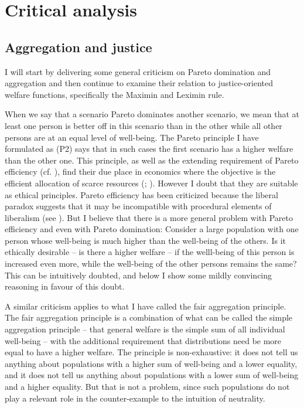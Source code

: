 \chapter{Critical analysis}
\section{Aggregation and justice}
\label{sec:obj1}

I will start by delivering some general criticism on Pareto domination and aggregation and then continue to examine their relation to justice-oriented welfare functions, specifically the Maximin and Leximin rule.   

When we say that a scenario Pareto dominates another scenario, we mean that at least one person is better off in this scenario than in the other while all other persons are at an equal level of well-being. The Pareto principle I have formulated as (P2) says that in such cases the first scenario has a higher welfare than the other one. This principle, as well as the extending requirement of Pareto efficiency (cf. ), find their due place in economics where the objective is the efficient allocation of scarce resources (; ). However I doubt that they are suitable as ethical principles. Pareto efficiency has been criticized because the liberal paradox suggests that it may be incompatible with procedural elements of liberalism (see ). But I believe that there is a more general problem with Pareto efficiency and even with Pareto domination: Consider a large population with one person whose well-being is much higher than the well-being of the others. Is it ethically desirable – is there a higher welfare – if the welll-being of this person is increased even more, while the well-being of the other persons remains the same? This can be intuitively doubted, and below I show some mildly convincing reasoning in favour of this doubt.  

A similar criticism applies to what I have called the fair aggregation principle. The fair aggregation principle is a combination of what can be called the simple aggregation principle – that general welfare is the simple sum of all individual well-being – with the additional requirement that distributions need be more equal to have a higher welfare. The principle is non-exhaustive: it does not tell us anything about populations with a higher sum of well-being and a lower equality, and it does not tell us anything about populations with a lower sum of well-being and a higher equality. But that is not a problem, since such populations do not play a relevant role in the counter-example to the intuition of neutrality.  

